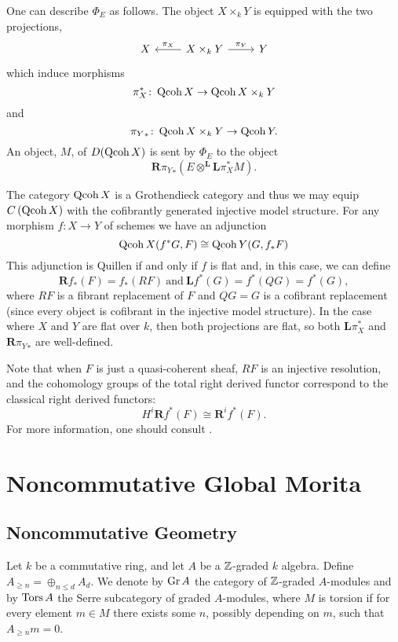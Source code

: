 \documentclass[reqno, 12pt]{amsart}
\begin{document}
One can describe $\Phi_E$ as follows.
The object $X \times_k Y$ is equipped with the two projections,
$$\begin{tikzcd}
  X  & X \times_k Y \arrow[swap]{l}{\pi_X}\arrow{r}{\pi_Y}& Y
\end{tikzcd}$$
which induce morphisms
$$\pi_X^\ast \colon \operatorname{Qcoh}X \to \operatorname{Qcoh}X \times_k Y$$
and
$${\pi_{Y}}_\ast \colon \operatorname{Qcoh}X \times_k Y \to \operatorname{Qcoh}Y.$$
An object, $M$, of $D(\operatorname{Qcoh}X)$ is sent by $\Phi_E$ to the object
$$\mathbf{R}{\pi_Y}_\ast \left(E \otimes^{\mathbf{L}} \mathbf{L}\pi_X^\ast M\right).$$

\begin{remark}
  The category $\operatorname{Qcoh}X$ is a Grothendieck category and thus we may equip $C\left(\operatorname{Qcoh}X\right)$ with the cofibrantly generated injective model structure.
  For any morphism $f \colon X \to Y$ of schemes we have an adjunction
  $$\operatorname{Qcoh}X(f^\ast G, F) \cong \operatorname{Qcoh}Y(G,f_\ast F)$$
  This adjunction is Quillen if and only if $f$ is flat and, in this case, we can define
  $$\mathbf{R}f_\ast(F) = f_\ast(RF)\ \text{and}\ \mathbf{L}f^\ast(G) = f^\ast(QG) = f^\ast(G),$$
  where $RF$ is a fibrant replacement of $F$ and $QG = G$ is a cofibrant replacement (since every object is cofibrant in the injective model structure).
  In the case where $X$ and $Y$ are flat over $k$, then both projections are flat, so both $\mathbf{L}\pi_X^\ast$ and $\mathbf{R}{\pi_Y}_\ast$ are well-defined.

  Note that when $F$ is just a quasi-coherent sheaf, $RF$ is an injective resolution, and the cohomology groups of the total right derived functor correspond to the classical right derived functors:
  $$H^i\mathbf{R}f^\ast(F) \cong \mathbf{R}^i f^\ast (F).$$
  For more information, one should consult \cite{Hov01}.
  
\end{remark}
\section{Noncommutative Global Morita}

\subsection{Noncommutative Geometry}
Let $k$ be a commutative ring, and let $A$ be a $\mathbb{Z}$-graded $k$ algebra.
Define $A_{\geq n} = \oplus_{n \leq d} A_d$.
We denote by $\operatorname{Gr}A$ the category of $\mathbb{Z}$-graded $A$-modules and by $\operatorname{Tors}A$ the Serre subcategory of graded $A$-modules, where $M$ is torsion if for every element $m \in M$ there exists some $n$, possibly depending on $m$, such that $A_{\geq n}m = 0$.
\end{document}
